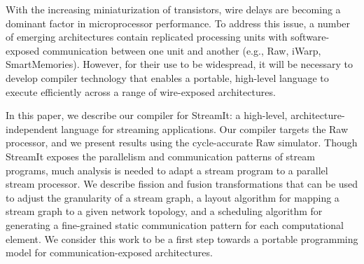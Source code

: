 With the increasing miniaturization of transistors, wire delays are
becoming a dominant factor in microprocessor performance.  To address
this issue, a number of emerging architectures contain replicated
processing units with software-exposed communication between one unit
and another (e.g., Raw, iWarp, SmartMemories).  However, for
their use to be widespread, it will be necessary to develop compiler
technology that enables a portable, high-level language to execute
efficiently across a range of wire-exposed architectures.

In this paper, we describe our compiler for StreamIt: a high-level,
architecture-independent language for streaming applications.  Our
compiler targets the Raw processor, and we present results using the
cycle-accurate Raw simulator.  Though StreamIt exposes the parallelism
and communication patterns of stream programs, much analysis is needed
to adapt a stream program to a parallel stream processor.  We describe
fission and fusion transformations that can be used to adjust the
granularity of a stream graph, a layout algorithm for mapping a stream
graph to a given network topology, and a scheduling algorithm for
generating a fine-grained static communication pattern for each
computational element.  We consider this work to be a first step
towards a portable programming model for communication-exposed
architectures.
